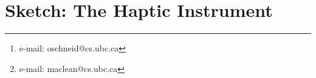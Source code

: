 \chapter{Sketch: The Haptic Instrument}
\label{ch:hapticinstrument}








\author{Oliver S. Schneider\thanks{e-mail: oschneid@cs.ubc.ca} \qquad \qquad Karon E. MacLean\thanks{e-mail: maclean@cs.ubc.ca}\\ %
        \scriptsize Department of Computer Science \\
        \scriptsize University of British Columbia, Vancouver, Canada
}


